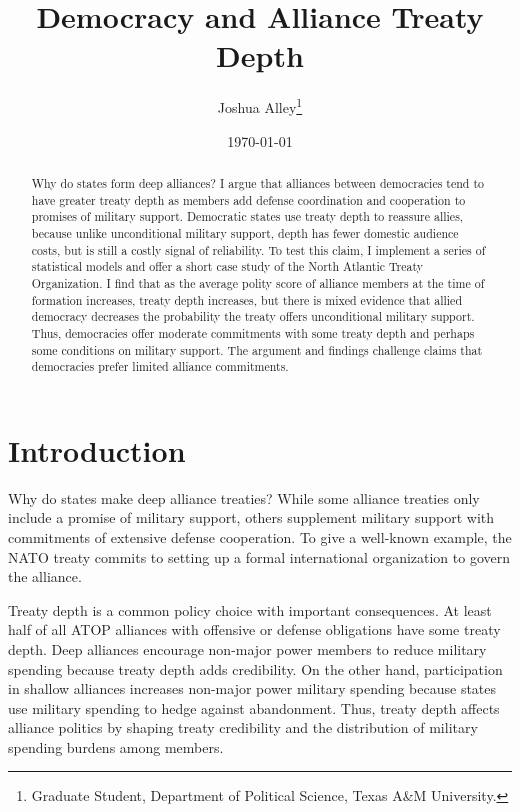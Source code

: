 \documentclass[12pt]{article}
\title{\textbf{Democracy and Alliance Treaty Depth}}
\author{Joshua Alley\footnote{Graduate Student,
Department of Political Science, Texas A\&M University.}}
\date{\today}
\begin{document}
\maketitle 

\doublespace 

\begin{abstract}
Why do states form deep alliances? 
I argue that alliances between democracies tend to have greater treaty depth as members add defense coordination and cooperation to promises of military support. 
Democratic states use treaty depth to reassure allies, because unlike unconditional military support, depth has fewer domestic audience costs, but is still a costly signal of reliability.
To test this claim, I implement a series of statistical models and offer a short case study of the North Atlantic Treaty Organization.
I find that as the average polity score of alliance members at the time of formation increases, treaty depth increases, but there is mixed evidence that allied democracy decreases the probability the treaty offers unconditional military support. 
Thus, democracies offer moderate commitments with some treaty depth and perhaps some conditions on military support. 
The argument and findings challenge claims that democracies prefer limited alliance commitments. 
\end{abstract}


\newpage 


\section{Introduction}


Why do states make deep alliance treaties? 
While some alliance treaties only include a promise of military support, others supplement military support with commitments of extensive defense cooperation. 
To give a well-known example, the NATO treaty commits to setting up a formal international organization to govern the alliance. 


Treaty depth is a common policy choice with important consequences. 
At least half of all ATOP alliances with offensive or defense obligations have some treaty depth.
Deep alliances encourage non-major power members to reduce military spending because treaty depth adds credibility.  
On the other hand, participation in shallow alliances increases non-major power military spending because states use military spending to hedge against abandonment.
Thus, treaty depth affects alliance politics by shaping treaty credibility and the distribution of military spending burdens among members. 
\end{document}
